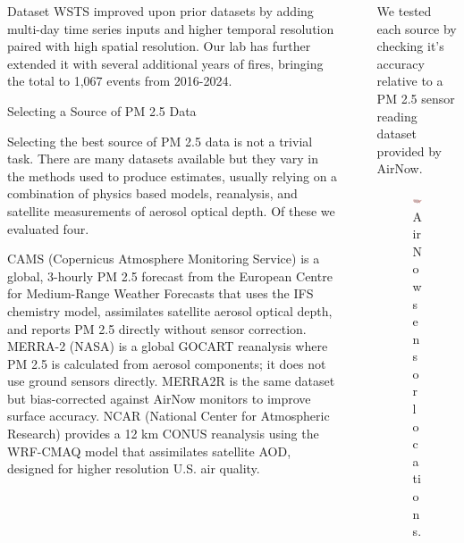 \documentclass[final]{beamer}
\newlength{\sepwidth}
\newlength{\colwidth}
\newcommand{\separatorcolumn}{\begin{column}{\sepwidth}\end{column}}
\begin{document}
\begin{frame}[t]
\begin{columns}[t]
\begin{column}{\colwidth}
\begin{block}{Dataset}
WSTS improved upon prior datasets by adding multi-day time series inputs and higher temporal resolution paired with high spatial resolution. Our lab has further extended it with several additional years of fires, bringing the total to 1,067 events from 2016-2024.
 

\end{block}

\begin{block}{Selecting a Source of PM 2.5 Data}

  Selecting the best source of PM 2.5 data is not a trivial task. There are many datasets available but they vary in the methods used to produce estimates, usually relying on a combination of physics based models, reanalysis, and satellite measurements of aerosol optical depth. Of these we evaluated four. 
  
  CAMS (Copernicus Atmosphere Monitoring Service) is a global, 3-hourly PM 2.5 forecast from the European Centre for Medium-Range Weather Forecasts that uses the IFS chemistry model, assimilates satellite aerosol optical depth, and reports PM 2.5 directly without sensor correction. MERRA-2 (NASA) is a global GOCART reanalysis where PM 2.5 is calculated from aerosol components; it does not use ground sensors directly. MERRA2R is the same dataset but bias-corrected against AirNow monitors to improve surface accuracy. NCAR (National Center for Atmospheric Research) provides a 12 km CONUS reanalysis using the WRF-CMAQ model that assimilates satellite AOD, designed for higher resolution U.S. air quality. 


\end{block}


  

\end{column}

\separatorcolumn

\begin{column}{\colwidth}

We tested each source by checking it's accuracy relative to a PM 2.5 sensor reading dataset provided by AirNow. 

\begin{figure}
        \centering
        \includegraphics[width=0.5\linewidth]{final_map.png}
        \caption{AirNow sensor locations.}
        \label{fig:placeholder}
\end{figure}





\end{column}
\end{columns}
\end{frame}
\end{document}
